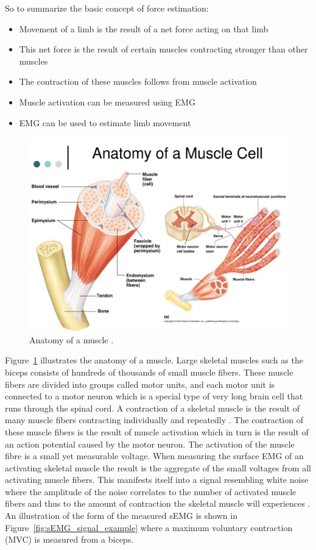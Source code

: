 So to summarize the basic concept of force estimation:
\begin{itemize}
    \item Movement of a limb is the result of a net force acting on that limb
    \item This net force is the result of certain muscles contracting stronger than other muscles
    \item The contraction of these muscles follows from muscle activation 
    \item Muscle activation can be measured using EMG
    \item EMG can be used to estimate limb movement
\end{itemize}

\begin{figure}[h!t]
	\begin{center}
		\includegraphics[width=0.7\columnwidth]{images/anatomy_of_a_muscle_cell.jpg}
	\end{center}
	\caption{Anatomy of a muscle \cite{human_anatomy_physiology}.}
	\label{fig:muscle_anatomy}
\end{figure}


Figure~\ref{fig:muscle_anatomy} illustrates the anatomy of a muscle. 
Large skeletal muscles such as the biceps consists of hundreds of thousands of small muscle fibers. These muscle fibers are divided into groups called motor units, and each motor unit is connected to a motor neuron which is a special type of very long brain cell that runs through the spinal cord. A contraction of a skeletal muscle is the result of many muscle fibers contracting individually and repeatedly \cite{human_anatomy_physiology}. The contraction of these muscle fibers is the result of muscle activation which in turn is the result of an action potential caused by the motor neuron. The activation of the muscle fibre is a small yet measurable voltage. When measuring the surface EMG of an activating skeletal muscle the result is the aggregate of the small voltages from all activating muscle fibers. This manifests itself into a signal resembling white noise where the amplitude of the noise correlates to the number of activated muscle fibers and thus to the amount of contraction the skeletal muscle will experiences \cite{optimal_myoprocessor}. An illustration of the form of the measured sEMG is shown in Figure~\ref{fig:sEMG_signal_example} where a maximum voluntary contraction (MVC) is measured from a biceps.
 
